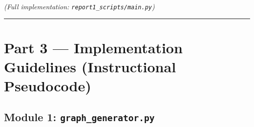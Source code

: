 \documentclass[
  11pt,
]{report}
\begin{document}
\emph{(Full implementation: \texttt{report1\_scripts/main.py})}

\begin{center}\rule{0.5\linewidth}{0.5pt}\end{center}

\section{Part 3 --- Implementation Guidelines (Instructional
Pseudocode)}\label{part-3-implementation-guidelines-instructional-pseudocode}

\subsection{\texorpdfstring{Module 1:
\texttt{graph\_generator.py}}{Module 1: graph\_generator.py}}\label{module-1-graph_generator.py}
\end{document}
